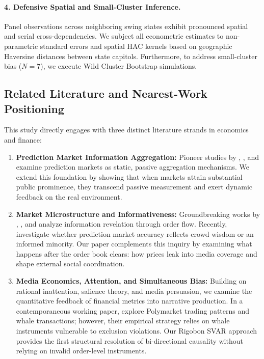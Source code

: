 \documentclass[12pt, a4paper]{article}
\begin{document}
\paragraph{4. Defensive Spatial and Small-Cluster Inference.}
Panel observations across neighboring swing states exhibit pronounced spatial and serial cross-dependencies. We subject all econometric estimates to \citet{DriscollKraay1998} non-parametric standard errors and \citet{Conley1999} spatial HAC kernels based on geographic Haversine distances between state capitols. Furthermore, to address small-cluster bias ($N=7$), we execute \citet{Cameron2008} Wild Cluster Bootstrap simulations.

\subsection{Related Literature and Nearest-Work Positioning}
This study directly engages with three distinct literature strands in economics and finance:
\begin{enumerate}
    \item \textbf{Prediction Market Information Aggregation:} Pioneer studies by \citet{WolfersZitzewitz2004}, \citet{Manski2006}, and \citet{Arrow2008} examine prediction markets as static, passive aggregation mechanisms. We extend this foundation by showing that when markets attain substantial public prominence, they transcend passive measurement and exert dynamic feedback on the real environment.
    \item \textbf{Market Microstructure and Informativeness:} Groundbreaking works by \citet{Kyle1985}, \citet{GlostenMilgrom1985}, and \citet{EasleyOHara2004} analyze information revelation through order flow. Recently, \citet{GomezCram2025} investigate whether prediction market accuracy reflects crowd wisdom or an informed minority. Our paper complements this inquiry by examining what happens after the order book clears: how prices leak into media coverage and shape external social coordination.
    \item \textbf{Media Economics, Attention, and Simultaneous Bias:} Building on \citet{Sims2003} rational inattention, \citet{Bordalo2013} salience theory, and \citet{DellaVignaKaplan2007} media persuasion, we examine the quantitative feedback of financial metrics into narrative production. In a contemporaneous working paper, \citet{TsangYang2026} explore Polymarket trading patterns and whale transactions; however, their empirical strategy relies on whale instruments vulnerable to exclusion violations. Our Rigobon SVAR approach provides the first structural resolution of bi-directional causality without relying on invalid order-level instruments.
\end{enumerate}
\end{document}
